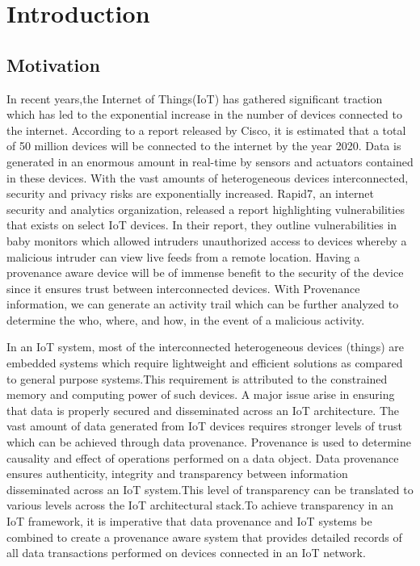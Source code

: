 \chapter{Introduction}\label{chapter:introduction}

\section{Motivation}
In recent years,the Internet of Things(IoT) has gathered significant traction which has led to the exponential increase in the number of devices connected to the internet. According to a report released by Cisco, it is estimated that a total of 50 million devices will be
connected to the internet by the year 2020. Data is generated in an enormous amount in real-time by sensors and actuators contained in these devices. With the vast amounts of heterogeneous devices interconnected,
security and privacy risks are exponentially increased. Rapid7, an  internet security and analytics organization, released a report highlighting vulnerabilities that exists on select IoT devices. In their report, they outline  vulnerabilities in
baby monitors which allowed intruders unauthorized access to devices
whereby a malicious intruder can view live feeds from a remote location. Having a provenance aware device will be of immense benefit to the security of the device since it ensures trust between interconnected devices. With Provenance information, we can generate an activity trail which can be further analyzed to determine the who, where, and how, in the event of a malicious activity. 
\par In an IoT system, most of the interconnected heterogeneous devices (things) are embedded systems which
require lightweight and efficient solutions as compared to general purpose
systems.This requirement is attributed to the constrained memory and computing power of such
devices. A major issue arise in ensuring that data is properly secured and
disseminated across an IoT architecture. The vast amount of data generated from IoT
devices requires stronger levels of trust which can be achieved through data
provenance. Provenance is used to determine causality and effect of 
operations performed on a data object. Data provenance ensures
authenticity, integrity and transparency between information disseminated across an
IoT system.This level of transparency can be translated to various levels across the IoT architectural stack.To achieve transparency in an IoT framework, it is imperative that data provenance and IoT systems be combined to create a provenance aware system that provides detailed records of all data
transactions performed on devices connected in an IoT network.



